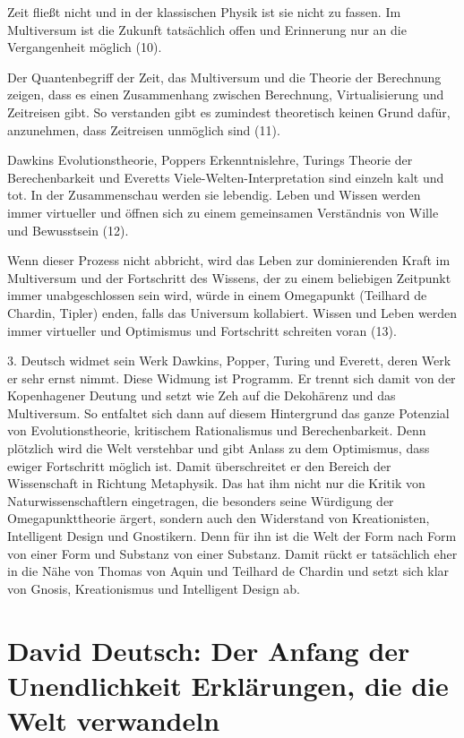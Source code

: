 \documentclass[
]{article}
\begin{document}
Zeit fließt nicht und in der klassischen Physik ist sie nicht zu fassen. Im Multiversum ist die Zukunft tatsächlich offen und Erinnerung nur an die Vergangenheit möglich (10).

Der Quantenbegriff der Zeit, das Multiversum und die Theorie der Berechnung zeigen, dass es einen Zusammenhang zwischen Berechnung, Virtualisierung und Zeitreisen gibt. So verstanden gibt es zumindest theoretisch keinen Grund dafür, anzunehmen, dass Zeitreisen unmöglich sind (11).

Dawkins Evolutionstheorie, Poppers Erkenntnislehre, Turings Theorie der Berechenbarkeit und Everetts Viele-Welten-Interpretation sind einzeln kalt und tot. In der Zusammenschau werden sie lebendig. Leben und Wissen werden immer virtueller und öffnen sich zu einem gemeinsamen Verständnis von Wille und Bewusstsein (12).

Wenn dieser Prozess nicht abbricht, wird das Leben zur dominierenden Kraft im Multiversum und der Fortschritt des Wissens, der zu einem beliebigen Zeitpunkt immer unabgeschlossen sein wird, würde in einem Omegapunkt (Teilhard de Chardin, Tipler) enden, falls das Universum kollabiert. Wissen und Leben werden immer virtueller und Optimismus und Fortschritt schreiten voran (13).

3. Deutsch widmet sein Werk Dawkins, Popper, Turing und Everett, deren Werk er sehr ernst nimmt. Diese Widmung ist Programm. Er trennt sich damit von der Kopenhagener Deutung und setzt wie Zeh auf die Dekohärenz und das Multiversum. So entfaltet sich dann auf diesem Hintergrund das ganze Potenzial von Evolutionstheorie, kritischem Rationalismus und Berechenbarkeit. Denn plötzlich wird die Welt verstehbar und gibt Anlass zu dem Optimismus, dass ewiger Fortschritt möglich ist. Damit überschreitet er den Bereich der Wissenschaft in Richtung Metaphysik. Das hat ihm nicht nur die Kritik von Naturwissenschaftlern eingetragen, die besonders seine Würdigung der Omegapunkttheorie ärgert, sondern auch den Widerstand von Kreationisten, Intelligent Design und Gnostikern. Denn für ihn ist die Welt der Form nach Form von einer Form und Substanz von einer Substanz. Damit rückt er tatsächlich eher in die Nähe von Thomas von Aquin und Teilhard de Chardin und setzt sich klar von Gnosis, Kreationismus und Intelligent Design ab.

\section{David Deutsch: Der Anfang der Unendlichkeit Erklärungen, die die Welt verwandeln}\label{david-deutsch-der-anfang-der-unendlichkeit-erkluxe4rungen-die-die-welt-verwandeln}
\end{document}
